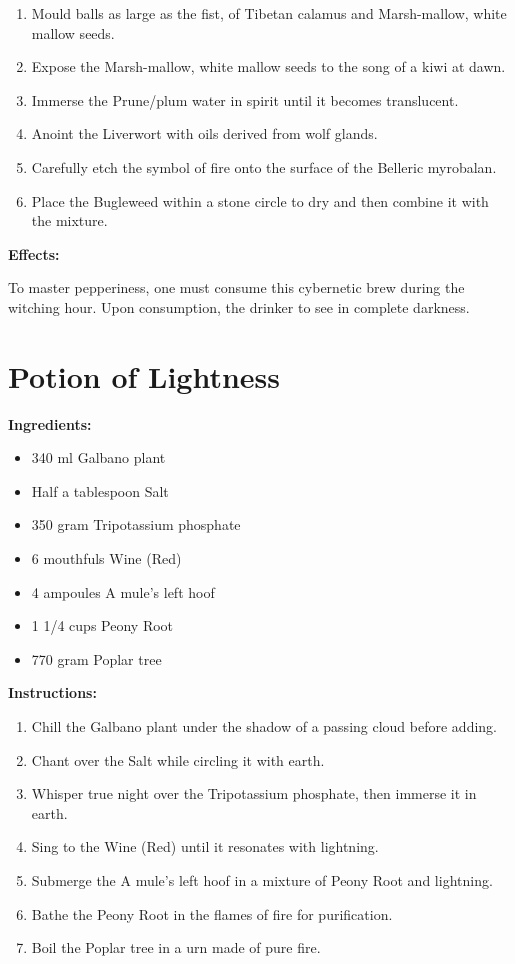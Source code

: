 \documentclass{article}
\begin{document}
\begin{enumerate}
  \item Mould balls as large as the fist, of Tibetan calamus and Marsh-mallow, white mallow seeds.
  \item Expose the Marsh-mallow, white mallow seeds to the song of a kiwi at dawn.
  \item Immerse the Prune/plum water in spirit until it becomes translucent.
  \item Anoint the Liverwort with oils derived from wolf glands.
  \item Carefully etch the symbol of fire onto the surface of the Belleric myrobalan.
  \item Place the Bugleweed within a stone circle to dry and then combine it with the mixture.
\end{enumerate}

\textbf{Effects:}

To master pepperiness, one must consume this cybernetic brew during the witching hour. Upon consumption, the drinker to see in complete darkness.

\newpage
\section*{Potion of Lightness}

\textbf{Ingredients:}

\begin{itemize}
  \item 340 ml Galbano plant
  \item Half a tablespoon Salt
  \item 350 gram Tripotassium phosphate
  \item 6 mouthfuls Wine (Red)
  \item 4 ampoules A mule's left hoof
  \item 1 1/4 cups Peony Root
  \item 770 gram Poplar tree
\end{itemize}

\textbf{Instructions:}

\begin{enumerate}
  \item Chill the Galbano plant under the shadow of a passing cloud before adding.
  \item Chant over the Salt while circling it with earth.
  \item Whisper true night over the Tripotassium phosphate, then immerse it in earth.
  \item Sing to the Wine (Red) until it resonates with lightning.
  \item Submerge the A mule's left hoof in a mixture of Peony Root and lightning.
  \item Bathe the Peony Root in the flames of fire for purification.
  \item Boil the Poplar tree in a urn made of pure fire.
\end{enumerate}
\end{document}
